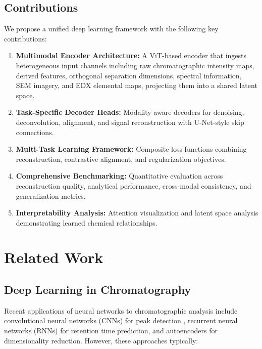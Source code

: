 \documentclass[12pt,a4paper]{article}
\begin{document}
\subsection{Contributions}

We propose a unified deep learning framework with the following key contributions:

\begin{enumerate}
    \item \textbf{Multimodal Encoder Architecture:} A ViT-based encoder that ingests heterogeneous input channels including raw chromatographic intensity maps, derived features, orthogonal separation dimensions, spectral information, SEM imagery, and EDX elemental maps, projecting them into a shared latent space.
    
    \item \textbf{Task-Specific Decoder Heads:} Modality-aware decoders for denoising, deconvolution, alignment, and signal reconstruction with U-Net-style skip connections.
    
    \item \textbf{Multi-Task Learning Framework:} Composite loss functions combining reconstruction, contrastive alignment, and regularization objectives.
    
    \item \textbf{Comprehensive Benchmarking:} Quantitative evaluation across reconstruction quality, analytical performance, cross-modal consistency, and generalization metrics.
    
    \item \textbf{Interpretability Analysis:} Attention visualization and latent space analysis demonstrating learned chemical relationships.
\end{enumerate}

\section{Related Work}

\subsection{Deep Learning in Chromatography}

Recent applications of neural networks to chromatographic analysis include convolutional neural networks (CNNs) for peak detection \cite{aichler2015maldi}, recurrent neural networks (RNNs) for retention time prediction, and autoencoders for dimensionality reduction. However, these approaches typically:
\end{document}
